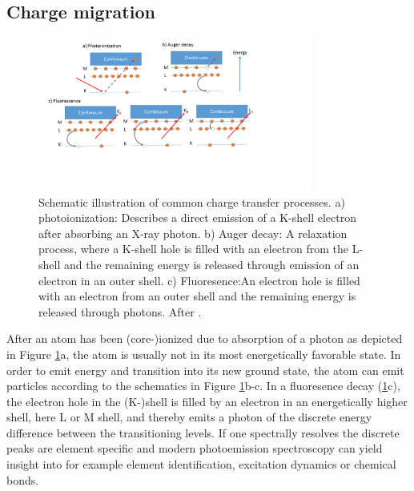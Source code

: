 \subsection{Charge migration}\label{sec:relaxation}
\begin{figure}
	\centering
		\includegraphics[width=0.80\textwidth]{images/el-relaxation.png}
	\caption[Schematic illustration of common charge transfer processes]{Schematic illustration of common charge transfer processes. a) photoionization: Describes a direct emission of a K-shell electron after absorbing an X-ray photon. b) Auger decay: A relaxation process, where a K-shell hole is filled with an electron from the L-shell and the remaining energy is released through emission of an electron in an outer shell. c) Fluoresence:An electron hole is filled with an electron from an outer shell and the remaining energy is released through photons. After \citep[][p.~19]{Als-Nielson-2011-JWS}.}
	\label{fig:el-relaxation}
\end{figure}
After an atom has been (core-)ionized due to absorption of a photon as depicted in Figure \ref{fig:el-relaxation}a, the atom is usually not in its most energetically favorable state. In order to emit energy and transition into its new ground state, the atom can emit particles according to the schematics in Figure \ref{fig:el-relaxation}b-c. In a fluoresence decay (\ref{fig:el-relaxation}c), the electron hole in the (K-)shell is filled by an electron in an energetically higher shell, here L or M shell, and thereby emits a photon of the discrete energy difference between the transitioning levels. If one spectrally resolves the discrete peaks are element specific and modern photoemission spectroscopy can yield insight into for example element identification, excitation dynamics or chemical bonds.
